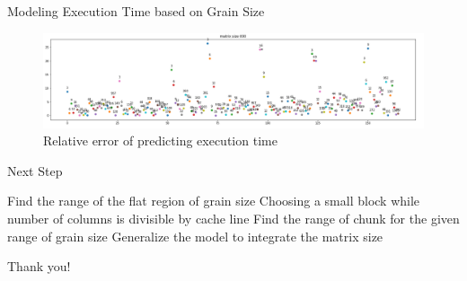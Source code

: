 \documentclass[10pt]{beamer}
\begin{document}
\begin{frame}{Modeling Execution Time based on Grain Size}
\begin{outline}	
	
	\begin{figure}
		\includegraphics[width=1\linewidth]{figures/error.png}	
		\caption{Relative error of predicting execution time}	
	\end{figure}
\end{outline}
\end{frame}

\begin{frame}{Next Step}
\begin{outline}	
	\1Find the range of the flat region of grain size  
	\1Choosing a small block while number of columns is divisible by cache line
	\1Find the range of chunk for the given range of grain size
	\1Generalize the model to integrate the matrix size 
\end{outline}
\end{frame}


\begin{frame}[standout]
  Thank you!
\end{frame}
\end{document}
